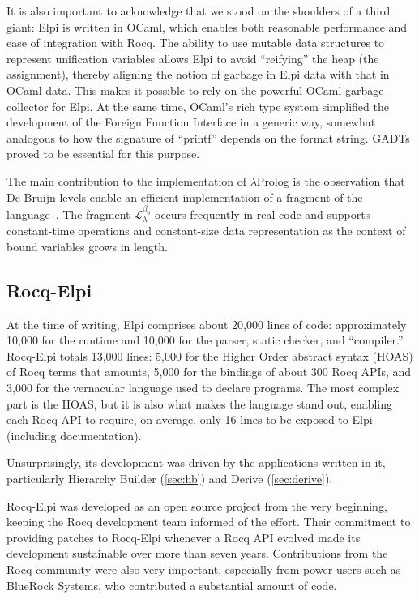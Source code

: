 \documentclass[a4paper, 11pt]{book}
\begin{document}
It is also important to acknowledge that we stood on the shoulders of a third giant: Elpi is written in OCaml, which enables both reasonable performance and ease of integration with Rocq. The ability to use mutable data structures to represent unification variables allows Elpi to avoid ``reifying'' the heap (the assignment), thereby aligning the notion of garbage in Elpi data with that in OCaml data. This makes it possible to rely on the powerful OCaml garbage collector for Elpi. At the same time, OCaml's rich type system simplified the development of the Foreign Function Interface in a generic way, somewhat analogous to how the signature of ``printf'' depends on the format string. GADTs proved to be essential for this purpose.

The main contribution to the implementation of $\lambda$Prolog is the observation that De Bruijn levels enable an efficient implementation of a fragment of the language~\cite{dunchev15lpar}. The fragment $\mathcal{L}_\lambda^{\beta_0}$ occurs frequently in real code and supports constant-time operations and constant-size data representation as the context of bound variables grows in length.

\subsection{Rocq-Elpi}


At the time of writing, Elpi comprises about 20,000 lines of code: approximately 10,000 for the runtime and 10,000 for the parser, static checker, and ``compiler.'' Rocq-Elpi totals 13,000 lines: 5,000 for the Higher Order abstract syntax (HOAS) of Rocq terms that amounts, 5,000 for the bindings of about 300 Rocq APIs, and 3,000 for the vernacular language used to declare programs. The most complex part is the HOAS, but it is also what makes the language stand out, enabling each Rocq API to require, on average, only 16 lines to be exposed to Elpi (including documentation).

Unsurprisingly, its development was driven by the applications written in it, particularly Hierarchy Builder (\cref{sec:hb}) and Derive (\cref{sec:derive}).

Rocq-Elpi was developed as an open source project from the very beginning, keeping the Rocq development team informed of the effort. Their commitment to providing patches to Rocq-Elpi whenever a Rocq API evolved made its development sustainable over more than seven years. Contributions from the Rocq community were also very important, especially from power users such as BlueRock Systems, who contributed a substantial amount of code.
\end{document}
